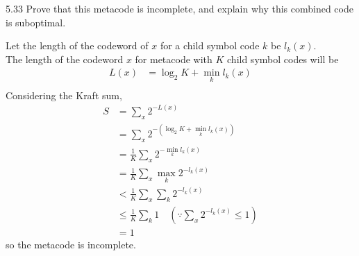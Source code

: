\documentclass[12pt, a4paper]{article}
\begin{document}
\begin{prob}{5.33}
    Prove that this metacode is incomplete, and explain why this combined code is suboptimal.
\end{prob}
\begin{sol}
Let the length of the codeword of $x$ for a child symbol code $k$ be $l_k(x)$. \\
The length of the codeword $x$ for metacode with $K$ child symbol codes will be
\begin{align*}
    L(x) &= \log_2 K + \min_k l_k(x) \\
\end{align*}
Considering the Kraft sum,
\begin{align*}
    S &= \sum_x 2^{-L(x)} \\
    &= \sum_x 2^{-(\log_2 K + \min_k l_k(x))} \\
    &= \frac{1}{K} \sum_x 2^{-\min_k l_k(x)} \\
    &= \frac{1}{K} \sum_x \max_k 2^{-l_k(x)} \\
    &< \frac{1}{K} \sum_x \sum_k 2^{-l_k(x)} \\
    &\leq \frac{1}{K} \sum_k 1 \quad (\because \sum_x 2^{-l_k(x)} \leq 1) \\
    &= 1
\end{align*}
so the metacode is incomplete.
\end{sol}
\end{document}
